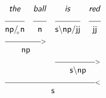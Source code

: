 \documentclass{article}
\newcommand{\deriv}[2]
{  \renewcommand{\arraystretch}{.5}
$\begin{array}[t]{*{#1}{c}}
     #2
   \end{array}$ }
\newcommand{\gf}[1]{\textsf{\textsl{#1}}}
\newcommand{\cf}[1]{\mbox{\ensuremath{\cfont{#1}}}}
\newcommand{\uline}[1]
{\mc{#1}{\hrulefill} }
\newcommand{\mc}[2]
  {\multicolumn{#1}{c}{#2}}
\newcommand{\cfont}{\mathsf}
\newcommand{\bs}{\backslash}
\newcommand{\subsa}[1]{\hspace{-0.75mm}_{_{#1}}}
\begin{document}
\deriv{4}{
\gf{the} & \gf{ball} & \gf{is} & \gf{red} \\
\uline{1} & \uline{1} & \uline{1} & \uline{1} \\
\cf{np/ \subsa{\diamond} n} & \cf{n} & \cf{s\bs np/ jj} & \cf{jj} \\
 \mc{2} {\hrulefill_{>}} \\
 \mc{2}{\cf{np}} \\
&& \mc{2} {\hrulefill_{>}} \\
&& \mc{2}{\cf{s\bs np}} \\
 \mc{4} {\hrulefill_{<}} \\
 \mc{4}{\cf{s}} \\
}

\vspace{5mm}
\end{document}
